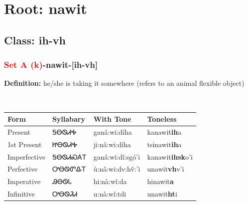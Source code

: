 \needspace{4in}
\section*{Root: nawit}
\nopagebreak
{}
\needspace{3in}
\subsection*{Class: ih-vh}
\nopagebreak
\needspace{2in}
\subsubsection*{\textcolor{Red}{Set A (k)}{-}\textbf{nawit}{-}[ih-vh]}
\nopagebreak
\textbf{Definition: } he/she is taking it somewhere (refers to an animal{\quotesinglbase} flexible object)
\\[0.5em]
\begin{tabularx}{\textwidth}{l X X X}%
\toprule%
\textbf{Form}&\textbf{Syllabary}&\textbf{With Tone}&\textbf{Toneless}\\%
\midrule%
Present&ᎦᎾᏫᏗᎭ&ganâ:wi:díha&kanawit\textbf{ih}a\\%
1st Present&ᏥᎾᏫᏗᎭ&ji:nâ:wi:díha&tsinawit\textbf{ih}a\\%
Imperfective&ᎦᎾᏫᏗᏍᎪᎢ&ganâ:wi:dǐ:sgó’i&kanawit\textbf{ihsk}o'i\\%
Perfective&ᎤᎾᏫᏛᎲᎢ&ù:nâ:wi:dv:hv̌:’i&unawit\textbf{vh}v'i\\%
Imperative&ᎯᎾᏫᏓ&hi:nà:wǐ:da&hinawit\textbf{a}\\%
Infinitive&ᎤᎾᏫᏘᏗ&u:nà:wǐ:tdi&unawit\textbf{ht}i\\%
\bottomrule%
\end{tabularx}
\\[1em]
